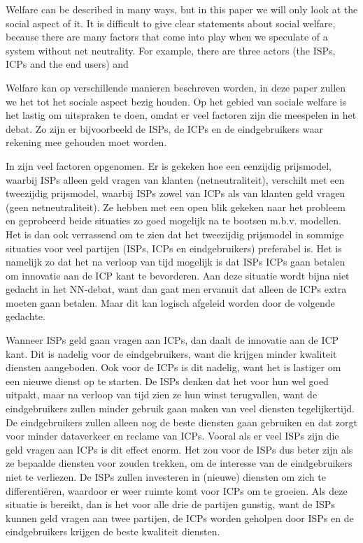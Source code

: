 Welfare can be described in many ways, but in this paper we will only look at the social aspect of it. It is difficult to give clear statements about social welfare, because there are many factors that come into play when we speculate of a system without net neutrality. For example, there are three actors (the \acp{ISP}, \acp{ICP} and the end users) and 


Welfare kan op verschillende manieren beschreven worden, in deze paper zullen we het tot het sociale aspect bezig houden. Op het gebied van sociale welfare is het lastig om uitspraken te doen, omdat er veel factoren zijn die meespelen in het debat. Zo zijn er bijvoorbeeld de \acp{ISP}, de \acp{ICP} en de eindgebruikers waar rekening mee gehouden moet worden.

In \cite{musacchio2009} zijn veel factoren opgenomen. Er is gekeken hoe een eenzijdig prijsmodel, waarbij \acp{ISP} alleen geld vragen van klanten (netneutraliteit), verschilt met een tweezijdig prijsmodel, waarbij \acp{ISP} zowel van \acp{ICP} als van klanten geld vragen (geen netneutraliteit). Ze hebben met een open blik gekeken naar het probleem en geprobeerd beide situaties zo goed mogelijk na te bootsen m.b.v. modellen. Het is dan ook verrassend om te zien dat het tweezijdig prijsmodel in sommige situaties voor veel partijen (\acp{ISP}, \acp{ICP} en eindgebruikers) preferabel is. Het is namelijk zo dat het na verloop van tijd mogelijk is dat \acp{ISP} \acp{ICP} gaan betalen om innovatie aan de \ac{ICP} kant te bevorderen. Aan deze situatie wordt bijna niet gedacht in het NN-debat, want dan gaat men ervanuit dat alleen de \acp{ICP} extra moeten gaan betalen. Maar dit kan logisch afgeleid worden door de volgende gedachte.

Wanneer \acp{ISP} geld gaan vragen aan \acp{ICP}, dan daalt de innovatie aan de \ac{ICP} kant. Dit is nadelig voor de eindgebruikers, want die krijgen minder kwaliteit diensten aangeboden. Ook voor de \acp{ICP} is dit nadelig, want het is lastiger om een nieuwe dienst op te starten. De \acp{ISP} denken dat het voor hun wel goed uitpakt, maar na verloop van tijd zien ze hun winst terugvallen, want de eindgebruikers zullen minder gebruik gaan maken van veel diensten tegelijkertijd. De eindgebruikers zullen alleen nog de beste diensten gaan gebruiken en dat zorgt voor minder dataverkeer en reclame van \acp{ICP}. Vooral als er veel \acp{ISP} zijn die geld vragen aan \acp{ICP} is dit effect enorm. Het zou voor de \acp{ISP} dus beter zijn als ze bepaalde diensten voor zouden trekken, om de interesse van de eindgebruikers niet te verliezen. De \acp{ISP} zullen investeren in (nieuwe) diensten om zich te differenti{\"e}ren, waardoor er weer ruimte komt voor \acp{ICP} om te groeien. Als deze situatie is bereikt, dan is het voor alle drie de partijen gunstig, want de \acp{ISP} kunnen geld vragen aan twee partijen, de \acp{ICP} worden geholpen door \acp{ISP} en de eindgebruikers krijgen de beste kwaliteit diensten.

